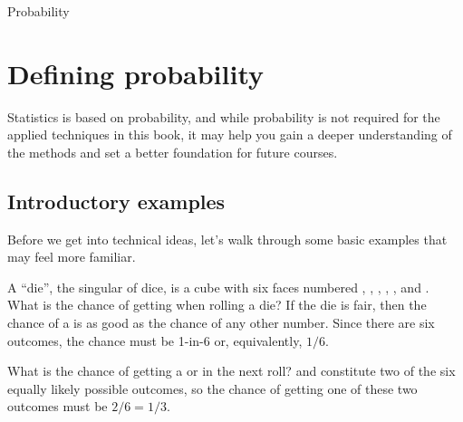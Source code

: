 \begin{chapterpage}{Probability}
  \label{probability}
  \label{ch_probability}
\end{chapterpage}
\renewcommand{\chapterfolder}{ch_probability}







\section{Defining probability}
\label{basicsOfProbability}

Statistics is based on probability,
and while probability is not required for the applied
techniques in this book, it may help you gain a deeper
understanding of the methods and set a better foundation
for future courses.


\subsection{Introductory examples}

Before we get into technical ideas, let's walk through
some basic examples that may feel more familiar.

\begin{examplewrap}
\begin{nexample}{A ``die'', the singular of dice, is a cube with six faces numbered , , , , , and . What is the chance of getting  when rolling a die?}\label{probOf1}
If the die is fair, then the chance of a  is as good as the chance of any other number. Since there are six outcomes, the chance must be 1-in-6 or, equivalently, $1/6$.
\end{nexample}
\end{examplewrap}

\begin{examplewrap}
\begin{nexample}{What is the chance of getting a  or  in the next roll?}\label{probOf1Or2}
 and  constitute two of the six equally likely possible outcomes, so the chance of getting one of these two outcomes must be $2/6 = 1/3$.
\end{nexample}
\end{examplewrap}

